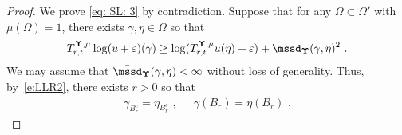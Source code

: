 \documentclass[11pt,letterpaper]{amsart}
\newcommand{\R}{{\mathbb R}}
\newcommand{\comma}{\,\,\mathrm{,}\;\,}
\newcommand{\fstop}{\,\,\mathrm{.}}
\newcommand{\QP}{{\mu}}
\newcommand{\e}{\varepsilon}
\newcommand{\dUpsilon}{{\mathbf \Upsilon}}
\newcommand{\U}{\dUpsilon}
\renewcommand{\1}{\mathbf 1}
\numberwithin{equation}{section}
\theoremstyle{plain}
\theoremstyle{definition}
\theoremstyle{remark}
\begin{document}
\begin{proof}
We prove \eqref{eq: SL: 3} by contradiction. Suppose that for any $\Omega \subset \Omega'$ with $\QP(\Omega)=1$, there exists $\gamma, \eta \in \Omega$ so that 
\begin{align} \label{eq: LH: chyp}
T^{\U, \QP}_{r, t}\log (u+\e)(\gamma) \ge \log (T^{\U, \QP}_{r, t}u(\eta)+\e) + \bar{\mssd}_\U(\gamma, \eta)^2 \fstop
\end{align}
We may assume that $\bar{\mssd}_\U(\gamma, \eta)<\infty$ without loss of generality.
Thus, by~\eqref{e:LLR2}, there exists $r>0$ so that  %
 \begin{align} \label{e:NRS}
 \gamma_{B_r^c}=\eta_{B_r^c} \comma \quad \gamma(B_r)=\eta(B_r)\fstop
 \end{align}  

\end{proof}
\end{document}
